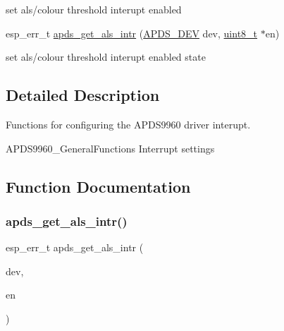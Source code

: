 \begin{DoxyCompactItemize}
\begin{DoxyCompactList}\small\item\em 
\begin{DoxyItemize}
\item set als/colour threshold interupt enabled 
\end{DoxyItemize}\end{DoxyCompactList}\item 
esp\+\_\+err\+\_\+t \hyperlink{group__APDS9960__InterruptFunctions_gac6c43e475ea901387fb27cafd688cf35}{apds\+\_\+get\+\_\+als\+\_\+intr} (\hyperlink{structAPDS9960__Driver}{A\+P\+D\+S\+\_\+\+D\+EV} dev, \hyperlink{vl53l0x__types_8h_aba7bc1797add20fe3efdf37ced1182c5}{uint8\+\_\+t} $\ast$en)
\begin{DoxyCompactList}\small\item\em 
\begin{DoxyItemize}
\item set als/colour threshold interupt enabled state 
\end{DoxyItemize}\end{DoxyCompactList}\end{DoxyCompactItemize}


\subsection{Detailed Description}
Functions for configuring the A\+P\+D\+S9960 driver interupt. 

A\+P\+D\+S9960\+\_\+\+General\+Functions Interrupt settings 

\subsection{Function Documentation}
\mbox{\label{group__APDS9960__InterruptFunctions_gac6c43e475ea901387fb27cafd688cf35}} 
\subsubsection{\texorpdfstring{apds\+\_\+get\+\_\+als\+\_\+intr()}{apds\_get\_als\_intr()}}
{\footnotesize\ttfamily esp\+\_\+err\+\_\+t apds\+\_\+get\+\_\+als\+\_\+intr (\begin{DoxyParamCaption}\item[{\hyperlink{structAPDS9960__Driver}{A\+P\+D\+S\+\_\+\+D\+EV}}]{dev,  }\item[{\hyperlink{vl53l0x__types_8h_aba7bc1797add20fe3efdf37ced1182c5}{uint8\+\_\+t} $\ast$}]{en }\end{DoxyParamCaption})}




